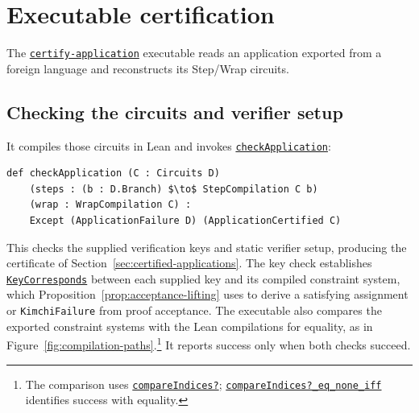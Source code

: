 \documentclass[11pt,a4paper]{article}
\newcommand{\inlinecode}[1]{\mbox{\texttt{#1}}}
\newenvironment{schematicblock}
  {\par\noindent\begin{minipage}{\linewidth}}
  {\end{minipage}\par}
\theoremstyle{definition}
\theoremstyle{insetstatement}
\begin{document}
\section{Executable certification}
\label{sec:executable-certification}

The \href{https://github.com/l-adic/snarky/blob/main/formal/scripts/certify_application.lean\#L10}{\inlinecode{certify-application}}
executable reads an application exported from a foreign language and
reconstructs its Step/Wrap circuits.

\subsection{Checking the circuits and verifier setup}
\label{sec:certifying-constraint-systems}

It compiles those circuits in Lean and invokes
\href{https://github.com/l-adic/snarky/blob/main/formal/pickles/Pickles/Application/CheckedCompile.lean\#L302}{\inlinecode{checkApplication}}:
\begin{schematicblock}
\begin{lstlisting}[style=schematic]
def checkApplication (C : Circuits D)
    (steps : (b : D.Branch) $\to$ StepCompilation C b)
    (wrap : WrapCompilation C) :
    Except (ApplicationFailure D) (ApplicationCertified C)
\end{lstlisting}
\end{schematicblock}

This checks the supplied verification keys and static verifier setup,
producing the certificate of Section~\ref{sec:certified-applications}.
The key check establishes
\href{https://github.com/l-adic/snarky/blob/main/formal/kimchi/Kimchi/KeyDerivation.lean\#L120}{\inlinecode{KeyCorresponds}}
between each supplied key and its compiled constraint system, which
Proposition~\ref{prop:acceptance-lifting} uses to derive a satisfying
assignment or \inlinecode{KimchiFailure} from proof acceptance.
The executable also compares the exported constraint systems with the
Lean compilations for equality, as in
Figure~\ref{fig:compilation-paths}.\footnote{The comparison uses
  \href{https://github.com/l-adic/snarky/blob/main/formal/pickles/PicklesFixture/ImportedIndices.lean\#L126}{\inlinecode{compareIndices?}};
  \href{https://github.com/l-adic/snarky/blob/main/formal/pickles/PicklesFixture/ImportedIndices.lean\#L134}{\inlinecode{compareIndices?\_eq\_none\_iff}}
  identifies success with equality.}
It reports success only when both checks succeed.
\end{document}
